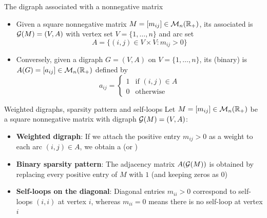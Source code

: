 \documentclass[aspectratio=169]{beamer}\usepackage[]{graphicx}\usepackage[]{xcolor}
\begin{document}
\begin{frame}{The digraph associated with a nonnegative matrix}
\begin{importantdefinition}
\begin{itemize}
\item Given a square nonnegative matrix $M = [m_{ij}] \in \mathcal{M}_n(\mathbb{R}_+)$, its associated  is $\mathcal{G}(M) = (V, A)$ with vertex set $V = \{1, \ldots, n\}$ and arc set
\[
A = \{(i, j) \in V \times V : m_{ij} > 0\}
\]
\item Conversely, given a digraph $G = (V, A)$ on $V = \{1, \ldots, n\}$, its (binary)  is $A(G) = [a_{ij}] \in \mathcal{M}_n(\mathbb{R}_+)$ defined by
\[
a_{ij} = \begin{cases}
1 & \text{if } (i, j) \in A \\
0 & \text{otherwise}
\end{cases}
\]
\end{itemize}
\end{importantdefinition}
\end{frame}

\begin{frame}{Weighted digraphs, sparsity pattern and self-loops}
Let $M = [m_{ij}] \in \mathcal{M}_n(\mathbb{R}_+)$ be a square nonnegative matrix with digraph $\mathcal{G}(M) = (V, A)$:
\vfill
\begin{itemize}
\item \textbf{Weighted digraph}: If we attach the positive entry $m_{ij} > 0$ as a weight to each arc $(i, j) \in A$, we obtain a  (or )
\vfill
\item \textbf{Binary sparsity pattern}: The adjacency matrix $A(\mathcal{G}(M))$ is obtained by replacing every positive entry of $M$ with $1$ (and keeping zeros as $0$)
\vfill
\item \textbf{Self-loops on the diagonal}: Diagonal entries $m_{ii} > 0$ correspond to self-loops $(i, i)$ at vertex $i$, whereas $m_{ii} = 0$ means there is no self-loop at vertex $i$
\end{itemize}
\end{frame}
\end{document}

